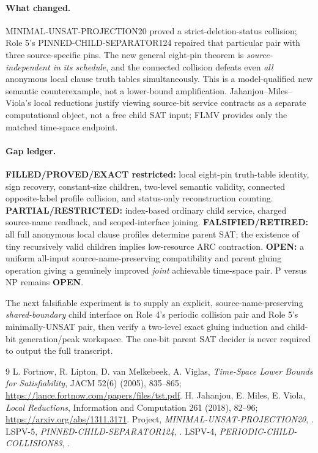 \documentclass[11pt]{article}
\begin{document}
\paragraph{What changed.}
MINIMAL-UNSAT-PROJECTION20 proved a strict-deletion-status
collision; Role 5's PINNED-CHILD-SEPARATOR124 repaired that
particular pair with three source-specific pins. The new
general eight-pin theorem is \emph{source-independent in its
schedule}, and the connected collision defeats even \emph{all}
anonymous local clause truth tables simultaneously. This is
a model-qualified new semantic counterexample, not a
lower-bound amplification. Jahanjou--Miles--Viola's local
reductions justify viewing source-bit service contracts as
a separate computational object, not a free child SAT input;
FLMV provides only the matched time-space endpoint.

\paragraph{Gap ledger.}
\textbf{FILLED/PROVED/EXACT restricted:} local eight-pin
truth-table identity, sign recovery, constant-size children,
two-level semantic validity, connected opposite-label profile
collision, and status-only reconstruction counting.
\textbf{PARTIAL/RESTRICTED:} index-based ordinary child service,
charged source-name readback, and scoped-interface joining.
\textbf{FALSIFIED/RETIRED:} all full anonymous local clause profiles
determine parent SAT; the existence of tiny recursively
valid children implies low-resource ARC contraction.
\textbf{OPEN:} a uniform all-input source-name-preserving
compatibility and parent gluing operation giving a genuinely
improved \emph{joint} achievable time-space pair.
P versus NP remains \textbf{OPEN}.

The next falsifiable experiment is to supply an explicit,
source-name-preserving \emph{shared-boundary} child interface
on Role 4's periodic collision pair and Role 5's minimally-UNSAT
pair, then verify a two-level exact gluing induction and
child-bit generation/peak workspace. The one-bit parent SAT
decider is never required to output the full transcript.

\begin{thebibliography}{9}
 L. Fortnow, R. Lipton, D. van Melkebeek,
A. Viglas, \emph{Time-Space Lower Bounds for Satisfiability},
JACM 52(6) (2005), 835--865;
\url{https://lance.fortnow.com/papers/files/tst.pdf}.
 H. Jahanjou, E. Miles, E. Viola,
\emph{Local Reductions}, Information and Computation 261
(2018), 82--96; \url{https://arxiv.org/abs/1311.3171}.
 Project, \emph{MINIMAL-UNSAT-PROJECTION20},
.
 LSPV-5, \emph{PINNED-CHILD-SEPARATOR124},
.
 LSPV-4, \emph{PERIODIC-CHILD-COLLISION83},
.
\end{thebibliography}
\end{document}
